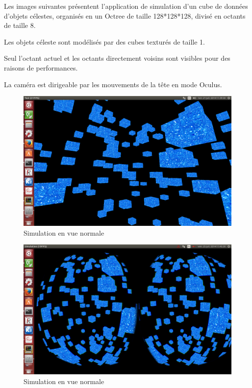 \documentclass[a4paper,french,12pt]{article}
\begin{document}
		\FloatBarrier
		Les images suivantes présentent l'application de simulation d'un cube de données d'objets célestes, 
		organisés en un Octree  de taille 128*128*128, divisé en octants de taille 8.
		
		Les objets céleste sont modélisés par des cubes texturés de taille 1.
		
		Seul l'octant actuel et les octants directement voisins sont visibles pour des raisons de performances.
		
		La caméra est dirigeable par les mouvements de la tête en mode Oculus.
		
		
		\begin{figure}
			      \centering
			      \includegraphics[width=1.0\textwidth]{octree_normal.png}
			      \caption{Simulation en vue normale}
		\end{figure}
		
		\begin{figure}
			      \centering
			      \includegraphics[width=1.0\textwidth]{octree_oculus.png}
			      \caption{Simulation en vue normale}
		\end{figure}
		\FloatBarrier
		
\end{document}
